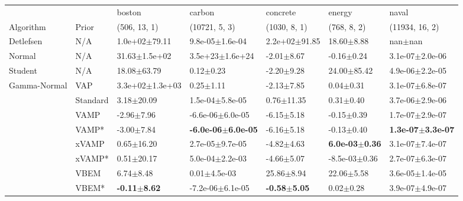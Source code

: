 \begin{tabular}{lllllll}
\toprule
             &       &                   boston &                         carbon &                 concrete &                     energy &                         naval \\
Algorithm & Prior& (506, 13, 1)& (10721, 5, 3)& (1030, 8, 1)& (768, 8, 2)& (11934, 16, 2)\\
\midrule
Detlefsen & N/A &        1.0e+02$\pm$79.11 &            9.8e-05$\pm$1.6e-04 &        2.2e+02$\pm$91.85 &             18.60$\pm$8.88 &                   nan$\pm$nan \\
Normal & N/A &        31.63$\pm$1.5e+02 &            3.5e+23$\pm$1.6e+24 &           -2.01$\pm$8.67 &             -0.16$\pm$0.24 &           3.1e-07$\pm$2.0e-06 \\
Student & N/A &          18.08$\pm$63.79 &                  0.12$\pm$0.23 &           -2.20$\pm$9.28 &            24.00$\pm$85.42 &           4.9e-06$\pm$2.2e-05 \\
Gamma-Normal & VAP &      3.3e+02$\pm$1.3e+03 &                  0.25$\pm$1.11 &           -2.13$\pm$7.85 &              0.04$\pm$0.31 &           3.1e-07$\pm$6.8e-07 \\
             & Standard &           3.18$\pm$20.09 &            1.5e-04$\pm$5.8e-05 &           0.76$\pm$11.35 &              0.31$\pm$0.40 &           3.7e-06$\pm$2.9e-06 \\
             & VAMP &           -2.96$\pm$7.96 &           -6.6e-06$\pm$6.0e-05 &           -6.15$\pm$5.18 &             -0.15$\pm$0.39 &           1.7e-07$\pm$2.9e-07 \\
             & VAMP* &           -3.00$\pm$7.84 &  \textbf{-6.0e-06$\pm$6.0e-05} &           -6.16$\pm$5.18 &             -0.13$\pm$0.40 &  \textbf{1.3e-07$\pm$3.3e-07} \\
             & xVAMP &           0.65$\pm$16.20 &            2.7e-05$\pm$9.7e-05 &           -4.82$\pm$4.63 &  \textbf{6.0e-03$\pm$0.36} &           3.1e-07$\pm$7.4e-07 \\
             & xVAMP* &           0.51$\pm$20.17 &            5.0e-04$\pm$2.2e-03 &           -4.66$\pm$5.07 &          -8.5e-03$\pm$0.36 &           2.7e-07$\pm$6.3e-07 \\
             & VBEM &            6.74$\pm$8.48 &               0.01$\pm$4.5e-03 &           25.86$\pm$8.94 &             22.06$\pm$5.58 &           3.6e-05$\pm$1.4e-05 \\
             & VBEM* &  \textbf{-0.11$\pm$8.62} &           -7.2e-06$\pm$6.1e-05 &  \textbf{-0.58$\pm$5.05} &              0.02$\pm$0.28 &           3.9e-07$\pm$4.9e-07 \\

\end{tabular}
